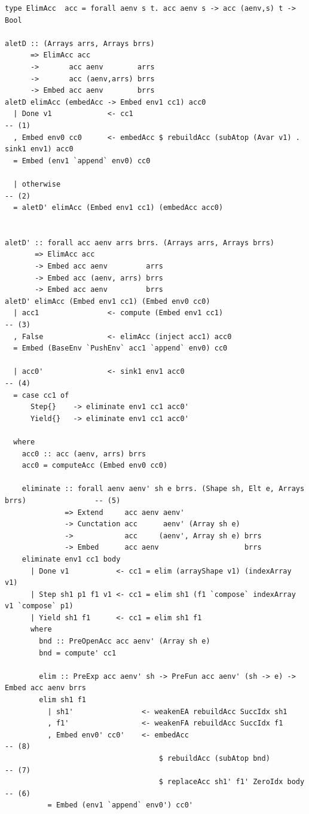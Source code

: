 \begin{lstlisting}[style=haskell_float
    ,label=lst:aletD
    ,caption={Smart constructor for let bindings}]
type ElimAcc  acc = forall aenv s t. acc aenv s -> acc (aenv,s) t -> Bool

aletD :: (Arrays arrs, Arrays brrs)
      => ElimAcc acc
      ->       acc aenv        arrs
      ->       acc (aenv,arrs) brrs
      -> Embed acc aenv        brrs
aletD elimAcc (embedAcc -> Embed env1 cc1) acc0
  | Done v1             <- cc1                                                         -- (1)
  , Embed env0 cc0      <- embedAcc $ rebuildAcc (subAtop (Avar v1) . sink1 env1) acc0
  = Embed (env1 `append` env0) cc0

  | otherwise                                                                          -- (2)
  = aletD' elimAcc (Embed env1 cc1) (embedAcc acc0)


aletD' :: forall acc aenv arrs brrs. (Arrays arrs, Arrays brrs)
       => ElimAcc acc
       -> Embed acc aenv         arrs
       -> Embed acc (aenv, arrs) brrs
       -> Embed acc aenv         brrs
aletD' elimAcc (Embed env1 cc1) (Embed env0 cc0)
  | acc1                <- compute (Embed env1 cc1)                                    -- (3)
  , False               <- elimAcc (inject acc1) acc0
  = Embed (BaseEnv `PushEnv` acc1 `append` env0) cc0

  | acc0'               <- sink1 env1 acc0                                             -- (4)
  = case cc1 of
      Step{}    -> eliminate env1 cc1 acc0'
      Yield{}   -> eliminate env1 cc1 acc0'

  where
    acc0 :: acc (aenv, arrs) brrs
    acc0 = computeAcc (Embed env0 cc0)

    eliminate :: forall aenv aenv' sh e brrs. (Shape sh, Elt e, Arrays brrs)                -- (5)
              => Extend     acc aenv aenv'
              -> Cunctation acc      aenv' (Array sh e)
              ->            acc     (aenv', Array sh e) brrs
              -> Embed      acc aenv                    brrs
    eliminate env1 cc1 body
      | Done v1           <- cc1 = elim (arrayShape v1) (indexArray v1)
      | Step sh1 p1 f1 v1 <- cc1 = elim sh1 (f1 `compose` indexArray v1 `compose` p1)
      | Yield sh1 f1      <- cc1 = elim sh1 f1
      where
        bnd :: PreOpenAcc acc aenv' (Array sh e)
        bnd = compute' cc1

        elim :: PreExp acc aenv' sh -> PreFun acc aenv' (sh -> e) -> Embed acc aenv brrs
        elim sh1 f1
          | sh1'                <- weakenEA rebuildAcc SuccIdx sh1
          , f1'                 <- weakenFA rebuildAcc SuccIdx f1
          , Embed env0' cc0'    <- embedAcc                                            -- (8)
                                    $ rebuildAcc (subAtop bnd)                         -- (7)
                                    $ replaceAcc sh1' f1' ZeroIdx body                 -- (6)
          = Embed (env1 `append` env0') cc0'


\end{lstlisting}
